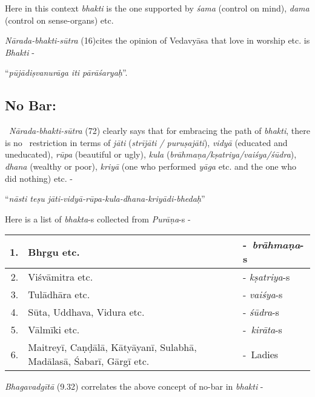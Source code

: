 Here in this context \textit{bhakti} is the one supported by \textit{śama} (control on mind), \textit{dama} (control on sense-organs) etc.

\textit{Nārada-bhakti-sūtra} (16)cites the opinion of Vedavyāsa that love in worship etc. is \textit{Bhakti} -

\begin{myquote}
\qquad\qquad\qquad“\textit{pūjādiṣvanurāga iti pārāśaryaḥ}”.
\end{myquote}


\subsection*{No Bar:}

 \textit{Nārada-bhakti-sūtra} (72) clearly says that for embracing the path of \textit{bhakti}, there is no  restriction in terms of \textit{jāti} (\textit{strījāti / puruṣajāti}), \textit{vidyā} (educated and uneducated), \textit{rūpa} (beautiful or ugly), \textit{kula} (\textit{brāhmaṇa/kṣatriya/vaiśya/śūdra}), \textit{dhana} (wealthy or poor), \textit{kriyā} (one who performed \textit{yāga} etc. and the one who did nothing) etc. -

\begin{myquote}
\qquad“\textit{nāsti teṣu jāti-vidyā-rūpa-kula-dhana-kriyādi-bhedaḥ}”
\end{myquote}

Here is a list of \textit{bhakta}-s collected from \textit{Purāṇa}-s -

\begin{longtable}{|r|p{6cm}|l|}
\hline
1. & Bhṛgu etc. & - \textit{brāhmaṇa}-s \\
\hline
2. & Viśvāmitra etc. & - \textit{kṣatriya}-s \\
\hline
3. & Tulādhāra etc. & - \textit{vaiśya}-s \\
\hline
4. & Sūta, Uddhava, Vidura etc. & - \textit{śūdra}-s \\
\hline
5. & Vālmīki etc. & - \textit{kirāta}-s \\
\hline
6. & Maitreyī, Caṇḍālā, Kātyāyanī, Sulabhā, Madālasā, Śabarī, Gārgī etc. & - Ladies \\
\hline
\end{longtable}

\textit{Bhagavadgītā} (9.32) correlates the above concept of no-bar in \textit{bhakti} -

